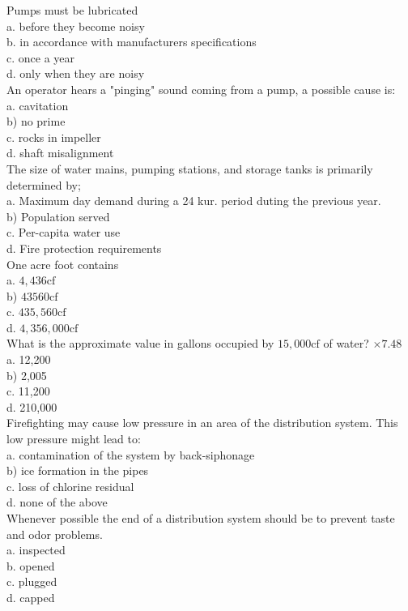 Pumps must be lubricated\\
a. before they become noisy\\
b. in accordance with manufacturers specifications\\
c. once a year\\
d. only when they are noisy\\

An operator hears a "pinging" sound coming from a pump, a possible cause is:\\
a. cavitation\\
b) no prime\\
c. rocks in impeller\\
d. shaft misalignment\\

The size of water mains, pumping stations, and storage tanks is primarily determined by;\\
a. Maximum day demand during a 24 kur. period duting the previous year.\\
b) Population served\\
c. Per-capita water use\\
d.  Fire protection requirements\\

One acre foot contains\\
a. $4,436 \mathrm{cf}$\\
b) $43560 \mathrm{cf}$\\
c. $435,560 \mathrm{cf}$\\
d. $4,356,000 \mathrm{cf}$\\

What is the approximate value in gallons occupied by $15,000 \mathrm{cf}$ of water? $\times 7.48$\\
a. 12,200\\
b) 2,005\\
c. 11,200\\
d. 210,000\\

Firefighting may cause low pressure in an area of the distribution system. This low pressure might lead to:\\
a. contamination of the system by back-siphonage\\
b) ice formation in the pipes\\
c. loss of chlorine residual\\
d. none of the above\\

Whenever possible the end of a distribution system should be to prevent taste and odor problems.\\
a. inspected\\
b. opened\\
c. plugged\\
d. capped\\

